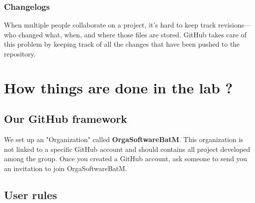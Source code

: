 \documentclass[a4paper,8pt]{article}
\begin{document}
\begin{addmargin}[2em]{0em}%
\subsubsection*{Changelogs}
\begin{addmargin}[2em]{0em}%
When multiple people collaborate on a project, it’s hard to keep track revisions—who changed what, when, and where those files are stored. GitHub takes care of this problem by keeping track of all the changes that have been pushed to the repository.
\end{addmargin}
\end{addmargin}

\section{How things are done in the lab ?}

\subsection{Our GitHub framework}
We set up an "Organization" called \textbf{OrgaSoftwareBatM}. This organization is not linked to a specific GitHub account and should contains all project developed among the group. Once you created a GitHub account, ask someone to send you an invitation to join OrgaSoftwareBatM.

\newpage 

\subsection{User rules}
\end{document}
